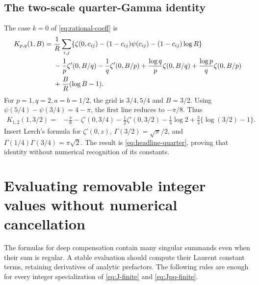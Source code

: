 \documentclass[11pt,a4paper]{article}
\theoremstyle{definition}
\numberwithin{equation}{section}
\begin{document}
\subsection{The two-scale quarter-Gamma identity}
The case $k=0$ of \eqref{eq:rational-coeff} is
\begin{align}
 K_{p,q}(1,B)={}&\frac1R\sum_{i,j}
   \{\zeta(0,c_{ij})-(1-c_{ij})\psi(c_{ij})
                              -(1-c_{ij})\log R\}\notag\\
 &-\frac1p\zeta'(0,B/q)-\frac1q\zeta'(0,B/p)
   +\frac{\log q}{p}\zeta(0,B/q)
   +\frac{\log p}{q}\zeta(0,B/p)\notag\\
 &+\frac BR(\log B-1).
                         \label{eq:Kpq-one}
\end{align}
For $p=1,q=2,a=b=1/2$, the grid is $3/4,5/4$ and $B=3/2$.
Using
$\psi(5/4)-\psi(3/4)=4-\pi$, the first line reduces to $-\pi/8$.
Thus
\begin{align*}
 K_{1,2}(1,3/2)={}&-\frac\pi8-\zeta'(0,3/4)
       -\frac12\zeta'(0,3/2)-\frac14\log2
       +\frac34\{\log(3/2)-1\}.
\end{align*}
Insert Lerch's formula for $\zeta'(0,z)$,
$\Gamma(3/2)=\sqrt\pi/2$, and
$\Gamma(1/4)\Gamma(3/4)=\pi\sqrt2$.
The result is \eqref{eq:headline-quarter}, proving that identity without
numerical recognition of its constants.

\section{Evaluating removable integer values without numerical cancellation}
\label{sec:finite-part-engine}

The formulas for deep compensation contain many singular summands even
when their sum is regular. A stable evaluation should compute their
Laurent constant terms, retaining derivatives of analytic prefactors.
The following rules are enough for every integer specialization of
\eqref{eq:J-finite} and \eqref{eq:Jpq-finite}.
\end{document}
